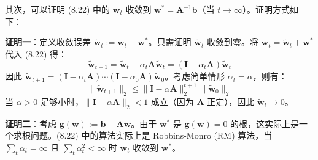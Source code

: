 \documentclass[UTF8]{article}
\begin{document}
其次，可以证明 (8.22) 中的 $\boldsymbol{w}_t$ 收敛到 $\boldsymbol{w}^* = \boldsymbol{A}^{-1}\boldsymbol{b}$（当 $t \to \infty$）。证明方式如下：

\textbf{证明一}：定义收敛误差 $\tilde{\boldsymbol{w}}_t := \boldsymbol{w}_t - \boldsymbol{w}^*$。只需证明 $\tilde{\boldsymbol{w}}_t$ 收敛到零。将 $\boldsymbol{w}_t = \tilde{\boldsymbol{w}}_t + \boldsymbol{w}^*$ 代入 (8.22) 得：
\[
\tilde{\boldsymbol{w}}_{t+1} = \tilde{\boldsymbol{w}}_t - \alpha_t \boldsymbol{A}\tilde{\boldsymbol{w}}_t = (\boldsymbol{I} - \alpha_t \boldsymbol{A})\tilde{\boldsymbol{w}}_t
\]
因此 $\tilde{\boldsymbol{w}}_{t+1} = (\boldsymbol{I} - \alpha_t \boldsymbol{A}) \cdots (\boldsymbol{I} - \alpha_0 \boldsymbol{A}) \tilde{\boldsymbol{w}}_0$。考虑简单情形 $\alpha_t = \alpha$，则有：
\[
\|\tilde{\boldsymbol{w}}_{t+1}\|_2 \leq \|\boldsymbol{I} - \alpha \boldsymbol{A}\|_2^{t+1} \|\tilde{\boldsymbol{w}}_0\|_2
\]
当 $\alpha > 0$ 足够小时，$\|\boldsymbol{I} - \alpha \boldsymbol{A}\|_2 < 1$ 成立（因为 $\boldsymbol{A}$ 正定），因此 $\tilde{\boldsymbol{w}}_t \to 0$。

\textbf{证明二}：考虑 $\boldsymbol{g}(\boldsymbol{w}) := \boldsymbol{b} - \boldsymbol{A}\boldsymbol{w}$。由于 $\boldsymbol{w}^*$ 是 $\boldsymbol{g}(\boldsymbol{w}) = 0$ 的根，这实际上是一个求根问题。(8.22) 中的算法实际上是 Robbins-Monro (RM) 算法，当 $\sum_t \alpha_t = \infty$ 且 $\sum_t \alpha_t^2 < \infty$ 时 $\boldsymbol{w}_t$ 收敛到 $\boldsymbol{w}^*$。
\end{document}

